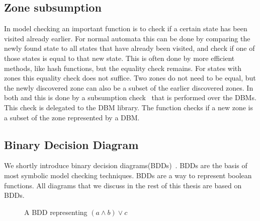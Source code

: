 \subsection{Zone subsumption}
\label{subsec:subsumtion}
In model checking an important function is to check if a certain state has been visited already earlier. For normal automata this can be done by comparing the newly found state to all states that have already been visited, and check if one of those states is equal to that new state. This is often done by more efficient methods, like hash functions, but the equality check remains. For states with zones this equality check does not suffice. Two zones do not need to be equal, but the newly discovered zone can also be a subset of the earlier discovered zones. In both \ltsmin{} and \uppaal{} this is done by a subsumption check~\cite{eemcs21972,bbdlpw-ftrtft02} that is performed over the DBMs. This check is delegated to the \uppaal{} DBM library. The function checks if a new zone is a subset of the zone represented by a DBM.

\subsection{Binary Decision Diagram}
We shortly introduce binary decision diagrams(BDDs)~\cite{Bryant:1986:GAB:6432.6433}. BDDs are the basis of most symbolic model checking techniques. BDDs are a way to represent boolean functions. All diagrams that we discuss in the rest of this thesis are based on BDDs.
\begin{figure}[h]
\centering
\caption{A BDD representing $(a \wedge b) \vee c$}
\label{fig:BDD}
\end{figure}



